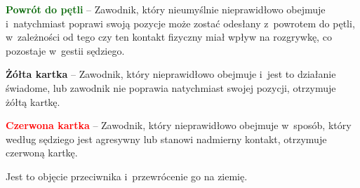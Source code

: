 \documentclass[12pt,a4paper]{article}
\renewcommand{\paragraph}[1]{
  \oldparagraph{#1}%
  \leftskip2cm
}
\newcommand\redcard[1]{\bgroup\textcolor{red}{\textbf{#1}}}
\newcommand\yellowcard[1]{\bgroup\textcolor{darkyellow}{\textbf{#1}}}
\newcommand\other[1]{\bgroup\textcolor{darkgreen}{\textbf{#1}}}
\begin{document}
\other{Powrót do pętli} -- Zawodnik, który nieumyślnie nieprawidłowo
obejmuje i~natychmiast poprawi swoją pozycje może zostać odesłany z~powrotem do pętli, w~zależności od tego czy ten kontakt fizyczny miał
wpływ na rozgrywkę, co pozostaje w~gestii sędziego.

\yellowcard{Żółta kartka} -- Zawodnik, który nieprawidłowo obejmuje i~jest to
działanie świadome, lub zawodnik nie poprawia natychmiast swojej
pozycji, otrzymuje żółtą kartkę.

\redcard{Czerwona kartka} -- Zawodnik, który nieprawidłowo obejmuje w~sposób, który według sędziego jest agresywny lub stanowi nadmierny
kontakt, otrzymuje czerwoną kartkę.

\paragraph{Przewracanie}
Jest to objęcie przeciwnika i~przewrócenie go na ziemię.
\end{document}
